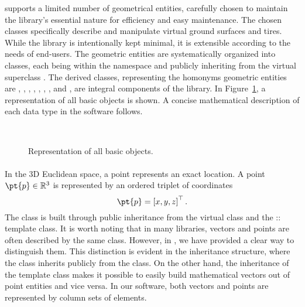 \Acme{} supports a limited number of geometrical entities, carefully chosen to maintain the library's essential nature for efficiency and easy maintenance. The chosen classes specifically describe and manipulate virtual ground surfaces and tires. While the library is intentionally kept minimal, it is extensible according to the needs of end-users. The geometric entities are systematically organized into classes, each being within the \Acme{} namespace and publicly inheriting from the virtual superclass \Entity{}. The derived classes, representing the homonyms geometric entities are \Point{}, \Line{}, \Ray{}, \Plane{}, \Segment{}, \Triangle{}, \Disk{}, and \Ball{}, are integral components of the library. In Figure~\ref{app1:fig:acme_entities}, a representation of all \Acme{} basic \Entity{} objects is shown. A concise mathematical description of each data type in the software follows.

\begin{figure}[htp]
  \centering
  \def\svgwidth{9cm}
   \\[1.0em]
  \def\svgwidth{9cm}
  
  \caption{Representation of all \Acme{} basic \Entity{} objects.}
  \label{app1:fig:acme_entities}
\end{figure}

\paragraph{\Point{}}
In the 3D Euclidean space, a point represents an exact location. A point $\pt{p} \in \mathbb{R}^3$ is represented by an ordered triplet of coordinates
%
\begin{equation*}
  \pt{p} = \left[x, y, z\right]^{\top} \text{.}
\end{equation*}
%
The \Point{} class is built through public inheritance from the virtual class \Entity{} and the \Eigen{}::\MatrixBase{} template class. It is worth noting that in many \cpp{} libraries, vectors and points are often described by the same class. However, in \Acme{}, we have provided a clear way to distinguish them. This distinction is evident in the inheritance structure, where the \Point{} class inherits publicly from the \Entity{} class. On the other hand, the inheritance of the \MatrixBase{} template class makes it possible to easily build mathematical vectors out of point entities and vice versa. In our software, both vectors and points are represented by column sets of elements.

